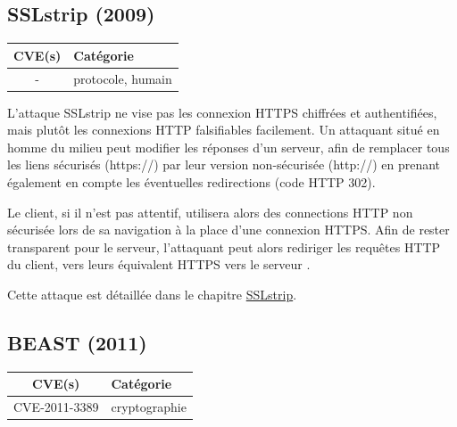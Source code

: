 

\subsection{SSLstrip (2009)}

\begin{tabularx}{0.96\textwidth}{|c|X|}
  \hline
  \textbf{CVE(s)} & \textbf{Catégorie} \\
  \hline
  - & protocole, humain \\
  \hline
\end{tabularx}

\vspace{1em}

L'attaque SSLstrip ne vise pas les connexion HTTPS chiffrées et authentifiées, mais plutôt les connexions HTTP falsifiables facilement. Un attaquant situé en homme du milieu peut modifier les réponses d'un serveur, afin de remplacer tous les liens sécurisés (https://) par leur version non-sécurisée (http://) en prenant également en compte les éventuelles redirections (code HTTP 302).

Le client, si il n'est pas attentif, utilisera alors des connections HTTP non sécurisée lors de sa navigation à la place d'une connexion HTTPS. Afin de rester transparent pour le serveur, l'attaquant peut alors rediriger les requêtes HTTP du client, vers leurs équivalent HTTPS vers le serveur \cite{sslstrip-website}.

Cette attaque est détaillée dans le chapitre \hyperref[sec:sslstrip]{SSLstrip}.



\subsection{BEAST (2011)}

\begin{tabularx}{0.96\textwidth}{|c|X|}
  \hline
  \textbf{CVE(s)} & \textbf{Catégorie} \\
  \hline
  CVE-2011-3389 & cryptographie \\
  \hline
\end{tabularx}

\vspace{1em}

